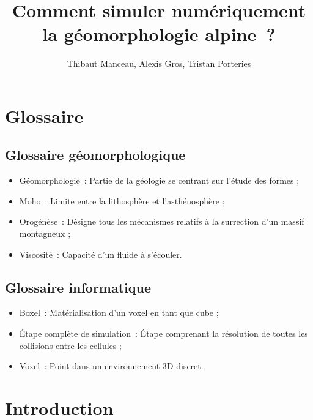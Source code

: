 \documentclass[a4paper,11pt]{article}
\title{Comment simuler numériquement la géomorphologie alpine~?}
\author{Thibaut Manceau, Alexis Gros, Tristan Porteries}
\begin{document}
\begin{Huge}
\maketitle
\end{Huge}

\clearpage

\tableofcontents

\clearpage

\section{Glossaire}

\subsection{Glossaire géomorphologique}

\begin{itemize}
  \item Géomorphologie~: Partie de la géologie se centrant sur l'étude des formes ;
  \item Moho~: Limite entre la lithosphère et l'asthénosphère ;
  \item Orogénèse~: Désigne tous les mécanismes relatifs à la surrection d'un massif montagneux ;
  \item Viscosité~: Capacité d'un fluide à s'écouler.
\end{itemize}

\subsection{Glossaire informatique}

\begin{itemize}
  \item Boxel~: Matérialisation d'un voxel en tant que cube ;
  \item Étape complète de simulation~: Étape comprenant la résolution de toutes les collisions entre les cellules ;
  \item Voxel~: Point dans un environnement 3D discret.
\end{itemize}

\section{Introduction}
\end{document}
